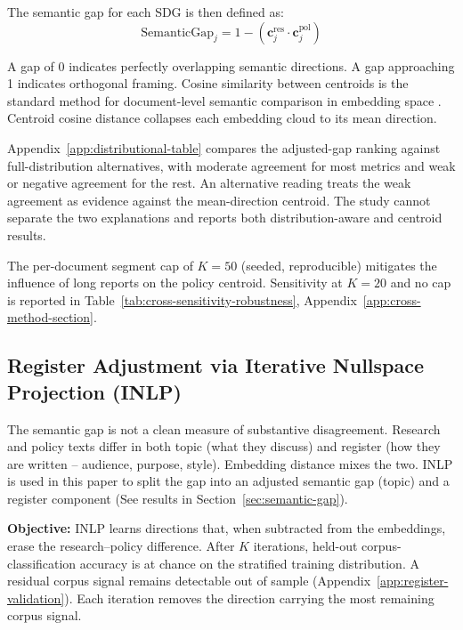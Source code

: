 \documentclass[12pt,a4paper]{article}
\begin{document}
The semantic gap for each SDG is then defined as:
\[
  \text{SemanticGap}_j = 1 - (\mathbf{c}^{\text{res}}_j \cdot \mathbf{c}^{\text{pol}}_j)
\]

A gap of 0 indicates perfectly overlapping semantic directions. A gap approaching 1 indicates orthogonal framing. Cosine similarity between centroids is the standard method for document-level semantic comparison in embedding space \parencite{vorderbruck2019text, Babic2020}. Centroid cosine distance collapses each embedding cloud to its mean direction.

Appendix~\ref{app:distributional-table} compares the adjusted-gap ranking against full-distribution alternatives, with moderate agreement for most metrics and weak or negative agreement for the rest. An alternative reading treats the weak agreement as evidence against the mean-direction centroid. The study cannot separate the two explanations and reports both distribution-aware and centroid results.

The per-document segment cap of $K = 50$ (seeded, reproducible) mitigates the influence of long reports on the policy centroid. Sensitivity at $K = 20$ and no cap is reported in Table~\ref{tab:cross-sensitivity-robustness}, Appendix~\ref{app:cross-method-section}.

\subsection{Register Adjustment via Iterative Nullspace Projection (INLP)}\label{sec:register-adjustment-inlp}

The semantic gap is not a clean measure of substantive disagreement. Research and policy texts differ in both topic (what they discuss) and register (how they are written -- audience, purpose, style). Embedding distance mixes the two. INLP \parencite{Ravfogel2020INLP} is used in this paper to split the gap into an adjusted semantic gap (topic) and a register component (See results in Section~\ref{sec:semantic-gap}).

\textbf{Objective:} INLP learns directions that, when subtracted from the embeddings, erase the research--policy difference. After $K$ iterations, held-out corpus-classification accuracy is at chance on the stratified training distribution. A residual corpus signal remains detectable out of sample (Appendix~\ref{app:register-validation}). Each iteration removes the direction carrying the most remaining corpus signal.
\end{document}

